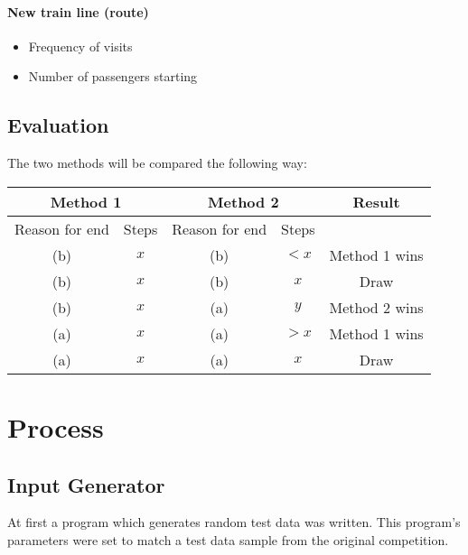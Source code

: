 \documentclass[10pt]{report}
\begin{document}
\subsubsection{New train line (route)}
\begin{itemize}
    \item Frequency of visits
    \item Number of passengers starting
\end{itemize}

\section{Evaluation}
The two methods will be compared the following way:

\begin{tabular}{|c|c|c|c|c|}
    \hline
    \multicolumn{2}{|c|}{Method 1} & \multicolumn{2}{|c|}{Method 2} & \multirow{2}{*}{Result}                         \\ \hline
    Reason for end                 & Steps                          & Reason for end          & Steps &               \\ \hline
    (b)                            & $x$                            & (b)                     & $< x$ & Method 1 wins \\ \hline
    (b)                            & $x$                            & (b)                     & $x$   & Draw          \\ \hline
    (b)                            & $x$                            & (a)                     & $y$   & Method 2 wins \\ \hline
    (a)                            & $x$                            & (a)                     & $>x$  & Method 1 wins \\ \hline
    (a)                            & $x$                            & (a)                     & $x$   & Draw          \\ \hline
\end{tabular}


\chapter{Process}
\section{Input Generator}
At first a program which generates random test data was written. This program’s parameters were set to match a test data sample from the original competition.
\end{document}
